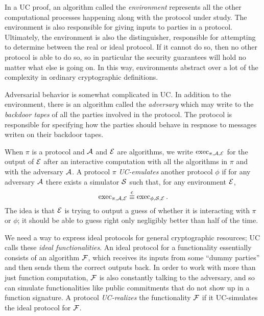 In a UC proof, an algorithm called the \emph{environment} represents all the
other computational processes happening along with the protocol under study. The
environment is also responsible for giving inputs to parties in a protocol.
Ultimately, the environment is also the distinguisher, responsible for
attempting to determine between the real or ideal protocol. If it cannot do so,
then no other protocol is able to do so, so in particular the security
guarantees will hold no matter what else is going on. In this way, environments
abstract over a lot of the complexity in ordinary cryptographic definitions.

Adversarial behavior is somewhat complicated in UC. In addition to the
environment, there is an algorithm called the \emph{adversary} which may write
to the \emph{backdoor tapes} of all the parties involved in the protocol. The
protocol is responsible for specifying how the parties should behave in respnose
to messages writen on their backdoor tapes.

When $\pi$ is a protocol and $\mathcal{A}$ and $\mathcal{E}$ are algorithms, we write
$\operatorname{exec}_{\pi,\mathcal{A},\mathcal{E}}$ for the output of $\mathcal{E}$ after an interactive computation
with all the algorithms in $\pi$ and with the adversary $\mathcal{A}$. A protocol $\pi$
\emph{UC-emulates} another protocol $\phi$ if for any adversary $\mathcal{A}$ there
exists a simulator $\mathcal{S}$ such that, for any environment $\mathcal{E}$, \[
  \operatorname{exec}_{\pi,\mathcal{A},\mathcal{E}}\overset{\text{c}}{\equiv} \operatorname{exec}_{\phi,\mathcal{S},\mathcal{E}}.
\]
The idea is that $\mathcal{E}$ is trying to output a guess of whether it is interacting
with $\pi$ or $\phi$; it should be able to guess right only negligibly better
than half of the time.

We need a way to express ideal protocols for general cryptographic resources; UC
calls these \emph{ideal functionalities}. An ideal protocol for a functionality
essentially consists of an algorithm $\mathcal{F}$, which receives its inputs from some
``dummy parties'' and then sends them the correct outputs back. In order to work
with more than just function computation, $\mathcal{F}$ is also constantly talking to
the adversary, and so can simulate functionalities like public commitments that
do not show up in a function signature. A protocol \emph{UC-realizes} the
functionality $\mathcal{F}$ if it UC-simulates the ideal protocol for $\mathcal{F}$.

